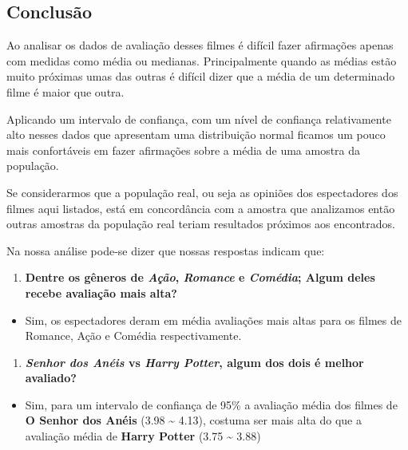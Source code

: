 \documentclass[]{article}
\providecommand{\tightlist}{%
  \setlength{\itemsep}{0pt}\setlength{\parskip}{0pt}}
\begin{document}
\newpage 

\subsection{Conclusão}\label{conclusuxe3o}

Ao analisar os dados de avaliação desses filmes é difícil fazer
afirmações apenas com medidas como média ou medianas. Principalmente
quando as médias estão muito próximas umas das outras é difícil dizer
que a média de um determinado filme é maior que outra.

Aplicando um intervalo de confiança, com um nível de confiança
relativamente alto nesses dados que apresentam uma distribuição normal
ficamos um pouco mais confortáveis em fazer afirmações sobre a média de
uma amostra da população.

Se considerarmos que a população real, ou seja as opiniões dos
espectadores dos filmes aqui listados, está em concordância com a
amostra que analizamos então outras amostras da população real teriam
resultados próximos aos encontrados.

Na nossa análise pode-se dizer que nossas respostas indicam que:

\begin{enumerate}
\def\labelenumi{\arabic{enumi}.}
\tightlist
\item
  \textbf{Dentre os gêneros de \emph{Ação}, \emph{Romance} e
  \emph{Comédia}; Algum deles recebe avaliação mais alta?}
\end{enumerate}

\begin{itemize}
\tightlist
\item
  Sim, os espectadores deram em média avaliações mais altas para os
  filmes de Romance, Ação e Comédia respectivamente.
\end{itemize}

\begin{enumerate}
\def\labelenumi{\arabic{enumi}.}
\setcounter{enumi}{1}
\tightlist
\item
  \textbf{\emph{Senhor dos Anéis} vs \emph{Harry Potter}, algum dos dois
  é melhor avaliado?}
\end{enumerate}

\begin{itemize}
\tightlist
\item
  Sim, para um intervalo de confiança de 95\% a avaliação média dos
  filmes de \textbf{O Senhor dos Anéis} (3.98 \textasciitilde{} 4.13),
  costuma ser mais alta do que a avaliação média de \textbf{Harry
  Potter} (3.75 \textasciitilde{} 3.88)
\end{itemize}
\end{document}
